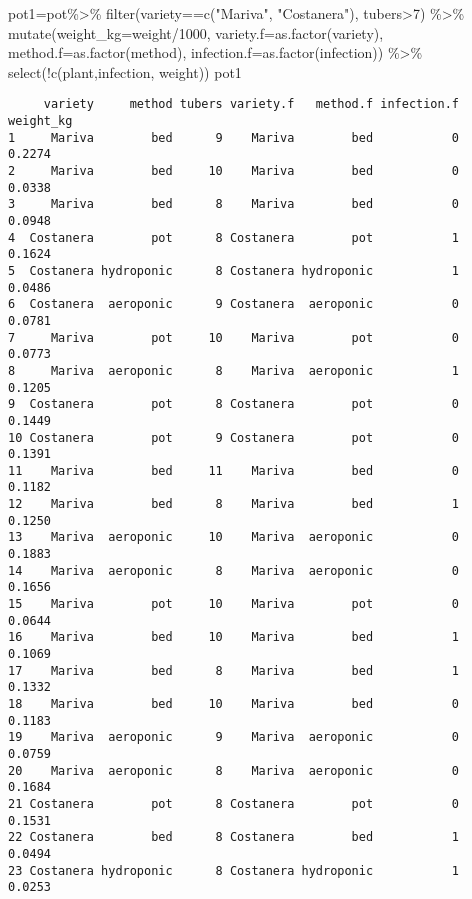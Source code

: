 \documentclass[
  letterpaper,
  DIV=11,
  numbers=noendperiod]{scrartcl}
\newenvironment{Shaded}{\begin{snugshade}}{\end{snugshade}}
\newcommand{\AttributeTok}[1]{\textcolor[rgb]{0.40,0.45,0.13}{#1}}
\newcommand{\DecValTok}[1]{\textcolor[rgb]{0.68,0.00,0.00}{#1}}
\newcommand{\FunctionTok}[1]{\textcolor[rgb]{0.28,0.35,0.67}{#1}}
\newcommand{\NormalTok}[1]{\textcolor[rgb]{0.00,0.23,0.31}{#1}}
\newcommand{\OtherTok}[1]{\textcolor[rgb]{0.00,0.23,0.31}{#1}}
\newcommand{\SpecialCharTok}[1]{\textcolor[rgb]{0.37,0.37,0.37}{#1}}
\newcommand{\StringTok}[1]{\textcolor[rgb]{0.13,0.47,0.30}{#1}}
\begin{document}
\begin{Shaded}
\begin{Highlighting}[]
\NormalTok{pot1}\OtherTok{=}\NormalTok{pot}\SpecialCharTok{\%\textgreater{}\%} 
  \FunctionTok{filter}\NormalTok{(variety}\SpecialCharTok{==}\FunctionTok{c}\NormalTok{(}\StringTok{"Mariva"}\NormalTok{, }\StringTok{"Costanera"}\NormalTok{), tubers}\SpecialCharTok{\textgreater{}}\DecValTok{7}\NormalTok{) }\SpecialCharTok{\%\textgreater{}\%} 
  \FunctionTok{mutate}\NormalTok{(}\AttributeTok{weight\_kg=}\NormalTok{weight}\SpecialCharTok{/}\DecValTok{1000}\NormalTok{, }
         \AttributeTok{variety.f=}\FunctionTok{as.factor}\NormalTok{(variety),}
         \AttributeTok{method.f=}\FunctionTok{as.factor}\NormalTok{(method),}
         \AttributeTok{infection.f=}\FunctionTok{as.factor}\NormalTok{(infection)) }\SpecialCharTok{\%\textgreater{}\%} 
  \FunctionTok{select}\NormalTok{(}\SpecialCharTok{!}\FunctionTok{c}\NormalTok{(plant,infection, weight))}
\NormalTok{pot1}
\end{Highlighting}
\end{Shaded}

\begin{verbatim}
     variety     method tubers variety.f   method.f infection.f weight_kg
1     Mariva        bed      9    Mariva        bed           0    0.2274
2     Mariva        bed     10    Mariva        bed           0    0.0338
3     Mariva        bed      8    Mariva        bed           0    0.0948
4  Costanera        pot      8 Costanera        pot           1    0.1624
5  Costanera hydroponic      8 Costanera hydroponic           1    0.0486
6  Costanera  aeroponic      9 Costanera  aeroponic           0    0.0781
7     Mariva        pot     10    Mariva        pot           0    0.0773
8     Mariva  aeroponic      8    Mariva  aeroponic           1    0.1205
9  Costanera        pot      8 Costanera        pot           0    0.1449
10 Costanera        pot      9 Costanera        pot           0    0.1391
11    Mariva        bed     11    Mariva        bed           0    0.1182
12    Mariva        bed      8    Mariva        bed           1    0.1250
13    Mariva  aeroponic     10    Mariva  aeroponic           0    0.1883
14    Mariva  aeroponic      8    Mariva  aeroponic           0    0.1656
15    Mariva        pot     10    Mariva        pot           0    0.0644
16    Mariva        bed     10    Mariva        bed           1    0.1069
17    Mariva        bed      8    Mariva        bed           1    0.1332
18    Mariva        bed     10    Mariva        bed           0    0.1183
19    Mariva  aeroponic      9    Mariva  aeroponic           0    0.0759
20    Mariva  aeroponic      8    Mariva  aeroponic           0    0.1684
21 Costanera        pot      8 Costanera        pot           0    0.1531
22 Costanera        bed      8 Costanera        bed           1    0.0494
23 Costanera hydroponic      8 Costanera hydroponic           1    0.0253
\end{verbatim}
\end{document}
